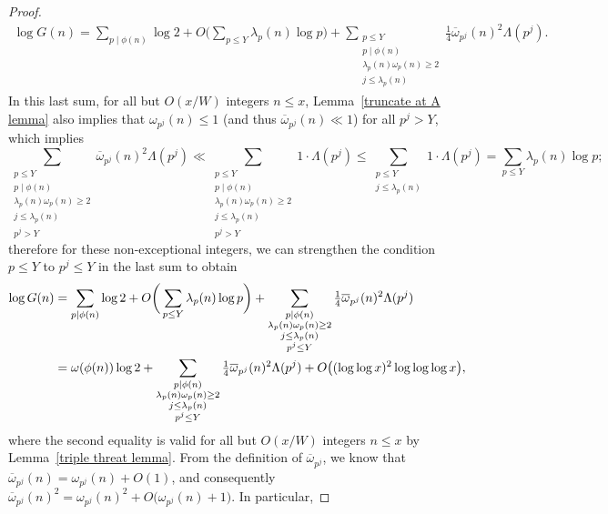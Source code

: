 \documentclass[12pt,reqno]{amsart}
\theoremstyle{definition}
\newcommand{\ovomega}{{\overline\omega}}
\begin{document}
\begin{proof}
\begin{align*}
\log G(n) = \sum_{p\mid\phi(n)} \log 2 + O\bigg( \sum_{p\le Y} \lambda_p(n) \log p \bigg) + \sum_{\substack{p\le Y \\ p\mid\phi(n) \\ \lambda_p(n)\omega_p(n)\ge2 \\ j\le\lambda_p(n)}} \tfrac14 \ovomega_{p^j}(n)^2 \Lambda(p^j).
\end{align*}
In this last sum, for all but $O(x/W)$ integers $n\le x$, Lemma~\ref{truncate at A lemma} also implies that $\omega_{p^j}(n) \le 1$ (and thus $\ovomega_{p^j}(n) \ll 1$) for all $p^j > Y$, which implies
\[
\sum_{\substack{p\le Y \\ p\mid\phi(n) \\ \lambda_p(n)\omega_p(n)\ge2 \\ j\le \lambda_p(n) \\ p^j > Y}} \ovomega_{p^j}(n)^2 \Lambda(p^j) \ll \sum_{\substack{p\le Y \\ p\mid\phi(n) \\ \lambda_p(n)\omega_p(n)\ge2 \\ j\le \lambda_p(n) \\ p^j > Y}} 1\cdot \Lambda(p^j) \le \sum_{\substack{p\le Y \\ j\le \lambda_p(n)}} 1\cdot \Lambda(p^j) = \sum_{p\le Y} \lambda_p(n)\log p;
\]
therefore for these non-exceptional integers, we can strengthen the condition $p\le Y$ to $p^j\le Y$ in the last sum to obtain
\begin{align}
\log G(n) &= \sum_{p\mid\phi(n)} \log 2 + O\bigg( \sum_{p\le Y} \lambda_p(n) \log p \bigg) + \sum_{\substack{p\mid\phi(n) \\ \lambda_p(n)\omega_p(n)\ge2 \\ j\le \lambda_p(n) \\ p^j\le Y}} \tfrac14 \ovomega_{p^j}(n)^2 \Lambda(p^j) \notag \\
&= \omega(\phi(n)) \log 2 + \sum_{\substack{p\mid\phi(n) \\ \lambda_p(n)\omega_p(n)\ge2 \\ j\le \lambda_p(n) \\ p^j\le Y}} \tfrac14 \ovomega_{p^j}(n)^2 \Lambda(p^j) + O\big( (\log\log x)^2\log\log\log x \big),  \label{bars present}
\end{align}
where the second equality is valid for all but $O(x/W)$ integers $n\le x$ by Lemma~\ref{triple threat lemma}. From the definition of $\ovomega_{p^j}$, we know that $\ovomega_{p^j}(n) = \omega_{p^j}(n) + O(1)$, and consequently $\ovomega_{p^j}(n)^2 = \omega_{p^j}(n)^2 + O\big( \omega_{p^j}(n)+1 \big)$. In particular,

\end{proof}
\end{document}
